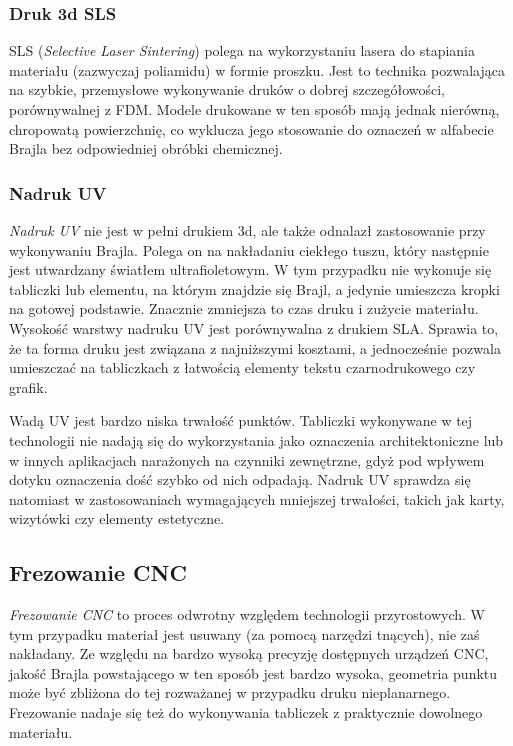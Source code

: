 \documentclass[12pt,a4paper]{article}
\begin{document}
\subsubsection{Druk 3d SLS}
SLS (\emph{Selective Laser Sintering}) polega na wykorzystaniu lasera do stapiania materiału (zazwyczaj poliamidu) w formie proszku. Jest to technika pozwalająca na szybkie, przemysłowe wykonywanie druków o dobrej szczegółowości, porównywalnej z FDM.
Modele drukowane w ten sposób mają jednak nierówną, chropowatą powierzchnię, co wyklucza jego stosowanie do oznaczeń w alfabecie Brajla bez odpowiedniej obróbki chemicznej.

\subsubsection{Nadruk UV}
\emph{Nadruk UV} nie jest w pełni drukiem 3d, ale także odnalazł zastosowanie przy wykonywaniu Brajla. Polega on na nakładaniu ciekłego tuszu, który następnie jest utwardzany  światłem ultrafioletowym. W tym przypadku nie wykonuje się tabliczki lub elementu, na którym znajdzie się Brajl, a jedynie umieszcza kropki na gotowej podstawie. Znacznie zmniejsza to czas druku i zużycie materiału.
Wysokość warstwy nadruku UV jest porównywalna z drukiem SLA. Sprawia to, że ta forma druku jest związana z najniższymi kosztami, a jednocześnie pozwala umieszczać na tabliczkach z łatwością elementy tekstu czarnodrukowego czy grafik.

Wadą UV jest bardzo niska trwałość punktów. Tabliczki wykonywane w tej technologii nie nadają się do wykorzystania jako oznaczenia architektoniczne lub w innych aplikacjach narażonych na czynniki zewnętrzne, gdyż pod wpływem dotyku oznaczenia dość szybko od nich odpadają.
Nadruk UV sprawdza się natomiast w zastosowaniach wymagających mniejszej trwałości, takich jak karty, wizytówki czy elementy estetyczne.

\subsection{Frezowanie CNC}
\emph{Frezowanie CNC} to proces odwrotny względem technologii przyrostowych. W tym przypadku materiał jest usuwany (za pomocą narzędzi tnących), nie zaś nakładany. Ze względu na bardzo wysoką precyzję dostępnych urządzeń CNC, jakość Brajla powstającego w ten sposób jest bardzo wysoka, geometria punktu może być zbliżona do tej rozważanej w przypadku druku nieplanarnego. Frezowanie nadaje się też do wykonywania tabliczek z praktycznie dowolnego materiału.
\end{document}
